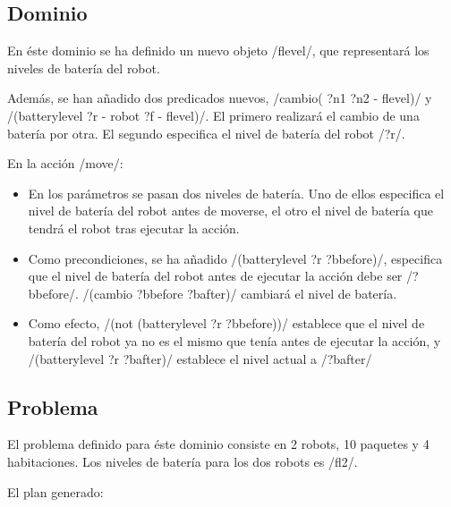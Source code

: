 \documentclass[	DIV=calc,%
							paper=a4,%
							fontsize=11pt]{scrartcl}	 					%
\newcommand{\lispscript}[2]{
    \myLisp[label=#2]{#1}
}
\begin{document}
\subsection{Dominio}
\label{sub:Dominio}

En éste dominio se ha definido un nuevo objeto \newlispinline/flevel/, que representará los niveles de batería del robot.

Además, se han añadido dos predicados nuevos, \newlispinline/cambio( ?n1 ?n2 - flevel)/ y \newlispinline/(batterylevel ?r - robot ?f - flevel)/. El primero realizará el cambio de una batería por otra. El segundo especifica el nivel de batería del robot \newlispinline/?r/.

En la acción \newlispinline/move/:

\begin{itemize}
	\item En los parámetros se pasan dos niveles de batería. Uno de ellos especifica el nivel de batería del robot antes de moverse, el otro el nivel de batería que tendrá el robot tras ejecutar la acción.
	\item Como precondiciones, se ha añadido \newlispinline/(batterylevel ?r ?bbefore)/, especifica que el nivel de batería del robot antes de ejecutar la acción debe ser \newlispinline/?bbefore/. \newlispinline/(cambio ?bbefore ?bafter)/ cambiará el nivel de batería.
	\item Como efecto, \newlispinline/(not (batterylevel ?r ?bbefore))/ establece que el nivel de batería del robot ya no es el mismo que tenía antes de ejecutar la acción, y \newlispinline/(batterylevel ?r ?bafter)/ establece el nivel actual a \newlispinline/?bafter/
\end{itemize}

\lispscript{../d2.1.pddl}{Dominio2.pddl}

\subsection{Problema}
\label{sub:Problema}

El problema definido para éste dominio consiste en 2 robots, 10 paquetes y 4 habitaciones. Los niveles de batería para los dos robots es \newlispinline/fl2/.

\lispscript{../p1e2.pddl}{p1e2.pddl}

El plan generado:
\end{document}
